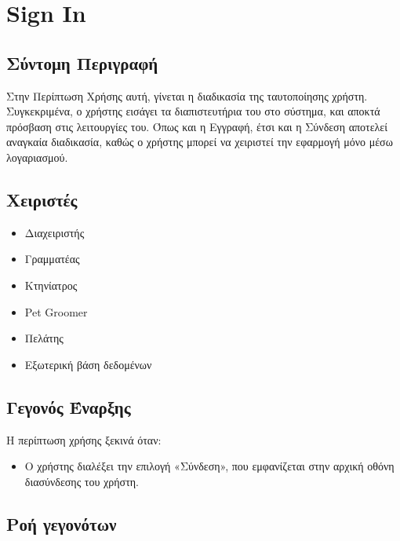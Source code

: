 \documentclass[12pt,a4paper,twoside]{book}
\begin{document}
\section{Sign In} %

\subsection{Σύντομη Περιγραφή}
Στην Περίπτωση Χρήσης αυτή, γίνεται η διαδικασία της ταυτοποίησης χρήστη. Συγκεκριμένα, ο χρήστης εισάγει τα διαπιστευτήρια του στο σύστημα, και αποκτά πρόσβαση στις λειτουργίες του. Όπως και η Εγγραφή, έτσι και η Σύνδεση αποτελεί αναγκαία διαδικασία, καθώς ο χρήστης μπορεί να χειριστεί την εφαρμογή μόνο μέσω λογαριασμού.%

\subsection{Χειριστές}
\begin{itemize}
  \item Διαχειριστής
  \item Γραμματέας
  \item Κτηνίατρος
  \item Pet Groomer
  \item Πελάτης
  \item Εξωτερική βάση δεδομένων %
\end{itemize}

\subsection{Γεγονός Έναρξης}
Η περίπτωση χρήσης ξεκινά όταν:
\begin{itemize}
  \item Ο χρήστης διαλέξει την επιλογή «Σύνδεση», που εμφανίζεται στην αρχική οθόνη διασύνδεσης του χρήστη. %
\end{itemize}

\subsection{Ροή γεγονότων}
\end{document}
